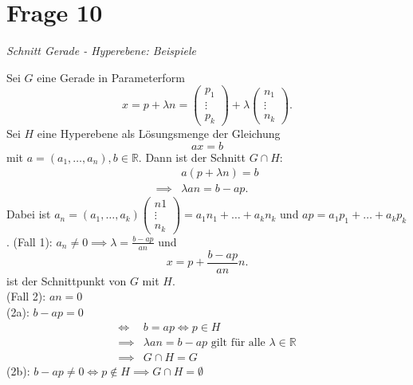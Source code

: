 \section{Frage 10}
\textit{Schnitt Gerade - Hyperebene: Beispiele}

Sei $G$ eine Gerade in Parameterform 
\[ 
    x=p+\lambda n = \begin{pmatrix}
        p_1\\\vdots\\p_k
    \end{pmatrix} + \lambda \begin{pmatrix}
        n_1\\ \vdots \\n_k
    \end{pmatrix}
.\]
Sei $H$ eine Hyperebene als Lösungsmenge der Gleichung
\[
    ax=b
\]
mit $a=(a_1,\dots,a_n), b\in \mathbb{R}$. Dann ist der Schnitt
$G \cap H$:
\begin{align*}
    &a(p + \lambda n) = b\\
    \implies &\lambda a n = b - ap
.\end{align*}
Dabei ist $a_n = (a_1,\dots,a_k)\begin{pmatrix}
    n1\\ \vdots\\n_k
\end{pmatrix} = a_1n_1+\dots + a_kn_k$ und $ap = a_1p_1 +\dots + a_kp_k$.
(Fall 1): $a_n \neq 0 \implies \lambda = \frac{b-ap}{an}$ und
\[
    x = p + \frac{b-ap}{an} n   
.\]
ist der Schnittpunkt von $G$ mit $H$.\\
(Fall 2): $an=0$\\
(2a): $b-ap = 0$ 
\begin{align*}
    \Longleftrightarrow\ & b = ap \Leftrightarrow p \in H\\
    \implies & \lambda an = b-ap \text{ gilt für alle } \lambda\in\mathbb{R}\\
    \implies & G\cap H = G
\end{align*}
(2b): $b-ap\neq 0 \Leftrightarrow p\notin H \implies G\cap H = \emptyset$
